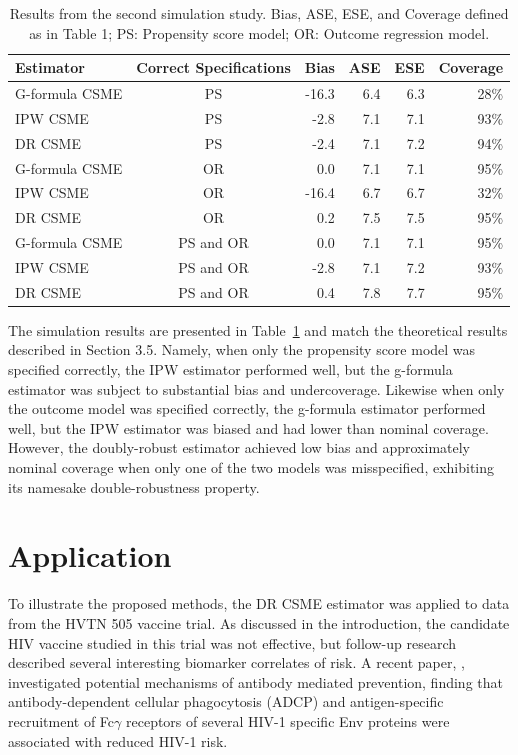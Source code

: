 \documentclass[useAMS,usenatbib,referee]{biom}
\begin{document}
\begin{table}[]
    \centering
    \footnotesize
    \caption{Results from the second simulation study. Bias, ASE, ESE, and Coverage defined as in Table 1; PS: Propensity score model; OR: Outcome regression model.}
    \begin{tabular}{lcrrrr}
    \hline
         Estimator & Correct Specifications & Bias & ASE & ESE & Coverage \\
         \hline
G-formula CSME & PS & -16.3 & 6.4 & 6.3 & 28\% \\
IPW CSME & PS & -2.8 & 7.1 & 7.1 & 93\% \\
DR CSME & PS & -2.4 & 7.1 & 7.2 & 94\% \\[3pt]
G-formula CSME & OR & 0.0 & 7.1 & 7.1 & 95\% \\
IPW CSME & OR & -16.4 & 6.7 & 6.7 & 32\% \\
DR CSME & OR & 0.2 & 7.5 & 7.5 & 95\% \\[3pt]
G-formula CSME & PS and OR & 0.0 & 7.1 & 7.1 & 95\% \\
IPW CSME & PS and OR & -2.8 & 7.1 & 7.2 & 93\% \\
DR CSME & PS and OR & 0.4 & 7.8 & 7.7 & 95\% \\
         \hline
    \end{tabular}
    \label{tab:two}
\end{table}

The simulation results are presented in Table~\ref{tab:two} and match the theoretical results described in Section 3.5. Namely, when only the propensity score model was specified correctly, the IPW estimator performed well, but the g-formula estimator was subject to substantial bias and undercoverage. Likewise when only the outcome model was specified correctly, the g-formula estimator performed well, but the IPW estimator was biased and had lower than nominal coverage. However, the doubly-robust estimator achieved low bias and approximately nominal coverage when only one of the two models was misspecified, exhibiting its namesake double-robustness property.

\section{Application}

To illustrate the proposed methods, the DR CSME estimator was applied to data from the HVTN 505 vaccine trial. As discussed in the introduction, the candidate HIV vaccine studied in this trial was not effective, but follow-up research described several interesting biomarker correlates of risk. A recent paper, \citet{neidich2019}, investigated potential mechanisms of antibody mediated prevention, finding that antibody-dependent cellular phagocytosis (ADCP) and antigen-specific recruitment of Fc$\gamma$ receptors of several HIV-1 specific Env proteins were associated with reduced HIV-1 risk.
\end{document}
